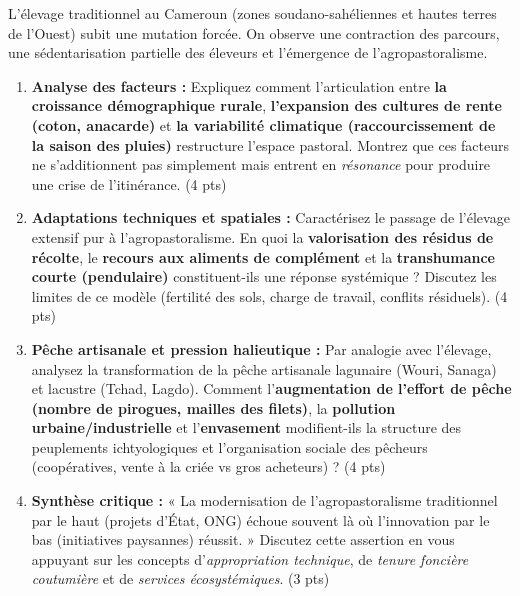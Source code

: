 \documentclass[11pt]{article}
\begin{document}
\begin{exercice}
L'élevage traditionnel au Cameroun (zones soudano-sahéliennes et hautes terres de l'Ouest) subit une mutation forcée. On observe une contraction des parcours, une sédentarisation partielle des éleveurs et l'émergence de l'agropastoralisme.

\begin{enumerate}
    \item \textbf{Analyse des facteurs :} Expliquez comment l'articulation entre \textbf{la croissance démographique rurale}, \textbf{l'expansion des cultures de rente (coton, anacarde)} et \textbf{la variabilité climatique (raccourcissement de la saison des pluies)} restructure l'espace pastoral. Montrez que ces facteurs ne s'additionnent pas simplement mais entrent en \textit{résonance} pour produire une crise de l'itinérance. (4 pts)
    
    \item \textbf{Adaptations techniques et spatiales :} Caractérisez le passage de l'élevage extensif pur à l'agropastoralisme. En quoi la \textbf{valorisation des résidus de récolte}, le \textbf{recours aux aliments de complément} et la \textbf{transhumance courte (pendulaire)} constituent-ils une réponse systémique ? Discutez les limites de ce modèle (fertilité des sols, charge de travail, conflits résiduels). (4 pts)
    
    \item \textbf{Pêche artisanale et pression halieutique :} Par analogie avec l'élevage, analysez la transformation de la pêche artisanale lagunaire (Wouri, Sanaga) et lacustre (Tchad, Lagdo). Comment l'\textbf{augmentation de l'effort de pêche (nombre de pirogues, mailles des filets)}, la \textbf{pollution urbaine/industrielle} et l'\textbf{envasement} modifient-ils la structure des peuplements ichtyologiques et l'organisation sociale des pêcheurs (coopératives, vente à la criée vs gros acheteurs) ? (4 pts)
    
    \item \textbf{Synthèse critique :} « La modernisation de l'agropastoralisme traditionnel par le haut (projets d'État, ONG) échoue souvent là où l'innovation par le bas (initiatives paysannes) réussit. » Discutez cette assertion en vous appuyant sur les concepts d'\textit{appropriation technique}, de \textit{tenure foncière coutumière} et de \textit{services écosystémiques}. (3 pts)
\end{enumerate}
\end{exercice}
\end{document}
